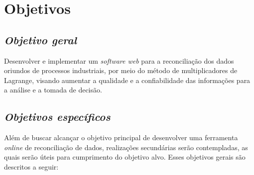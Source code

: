\section{Objetivos}
\subsection{\textit{Objetivo geral}}

Desenvolver e implementar um \textit{software web} para a reconciliação dos dados oriundos de processos industriais, por meio do método de multiplicadores de Lagrange, visando aumentar a qualidade e a confiabilidade das informações para a análise e a tomada de decisão.

\subsection{\textit{Objetivos específicos}}

Além de buscar alcançar o objetivo principal de desenvolver uma ferramenta \textit{online} de reconciliação de dados, realizações secundárias serão contempladas, as quais serão úteis para cumprimento do objetivo alvo. Esses objetivos gerais são descritos a seguir: 

